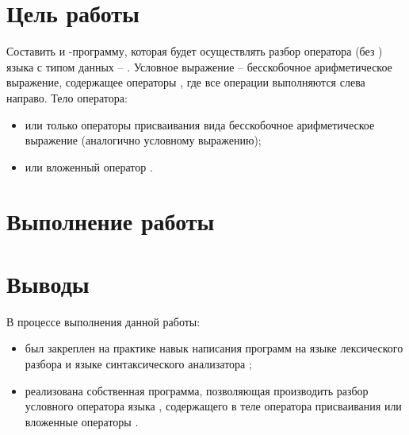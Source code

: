 





\tableofcontents
\newpage

\section{Цель работы}

Составить  и -программу, которая будет осуществлять разбор оператора  (без ) языка  с типом данных -- . Условное выражение -- бесскобочное арифметическое выражение, содержащее операторы \code{+ - * /}, где все операции выполняются слева направо. Тело оператора:
\begin{itemize}
	\item или только операторы присваивания вида  бесскобочное арифметическое выражение (аналогично условному выражению);
	\item или вложенный оператор .
\end{itemize}

\section{Выполнение работы}


\section{Выводы}

В процессе выполнения данной работы:

\begin{itemize}
	\item был закреплен на практике навык написания программ на языке лексического разбора  и языке синтаксического анализатора ;
	\item реализована собственная программа, позволяющая производить разбор условного оператора  языка , содержащего в теле оператора присваивания или вложенные операторы .
\end{itemize}


